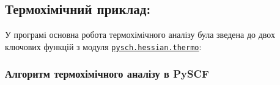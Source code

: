%


\subsection{Термохімічний приклад: }




У програмі  основна робота термохімічного аналізу була зведена до двох ключових функцій з модуля \href{https://pyscf.org/_modules/pyscf/hessian/thermo.html}{\texttt{pysch.hessian.thermo}}:

\subsubsection{Алгоритм термохімічного аналізу в PySCF}

